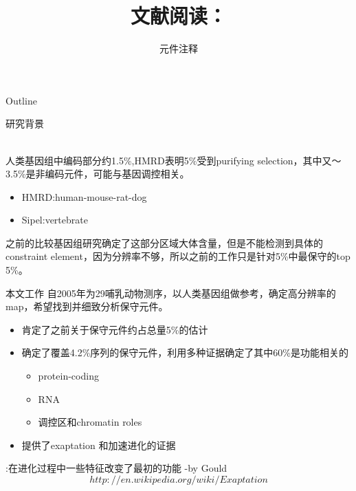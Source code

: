 \documentclass{beamer}
\begin{document}
{
\begin{frame}
    \title{文献阅读：{\color{red}{A high-resolution map of human evolutionary constraint using 29 mammals}}}
    \author{元件注释}
    \maketitle
\end{frame}
}

\begin{frame}{Outline}                       %
\tableofcontents
\end{frame}
\begin{frame}{研究背景}

{\color{red}{已知:}}\\
人类基因组中编码部分约1.5\%,HMRD表明5\%受到purifying selection，其中又～3.5\%是非编码元件，可能与基因调控相关。\\
{\color{red}{已有研究：}}
\begin{itemize}				
\item HMRD:human-mouse-rat-dog
\item Sipel:vertebrate 
\end{itemize}
之前的比较基因组研究确定了这部分区域大体含量，但是不能检测到具体的constraint element，因为分辨率不够，所以之前的工作只是针对5\%中最保守的top 5\%。
\end{frame}

\begin{frame}{本文工作}
自2005年为29哺乳动物测序，以人类基因组做参考，确定高分辨率的map，希望找到并细致分析保守元件。
\begin{itemize}
\item 肯定了之前关于保守元件约占总量5\%的估计
\item 确定了覆盖4.2\%序列的保守元件，利用多种证据确定了其中60\%是功能相关的
	\begin{itemize}
	\item	protein-coding 
	\item RNA
	\item 调控区和chromatin roles
	\end{itemize}
\item 提供了exaptation 和加速进化的证据
\end{itemize}
{\color{red}{Expation}}:在进化过程中一些特征改变了最初的功能 -by Gould\\
$$http://en.wikipedia.org/wiki/Exaptation$$								
\end{frame}
					
\end{document}
